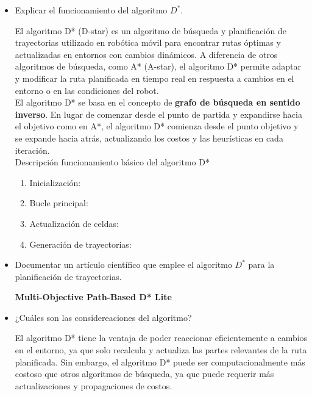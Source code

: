 \documentclass{article}
\begin{document}
\begin{itemize}
\item Explicar el funcionamiento del algoritmo $D^{*}$.

  El algoritmo D* (D-star) es un algoritmo de búsqueda y planificación de trayectorias utilizado en robótica móvil para encontrar rutas óptimas y actualizadas en entornos con cambios dinámicos. A diferencia de otros algoritmos de búsqueda, como A* (A-star), el algoritmo D* permite adaptar y modificar la ruta planificada en tiempo real en respuesta a cambios en el entorno o en las condiciones del robot.\\

  El algoritmo D* se basa en el concepto de \textbf{grafo de búsqueda en sentido inverso}. En lugar de comenzar desde el punto de partida y expandirse hacia el objetivo como en A*, el algoritmo D* comienza desde el punto objetivo y se expande hacia atrás, actualizando los costos y las heurísticas en cada iteración.\\

  Descripción funcionamiento básico del algoritmo D*

  \begin{enumerate}
  \item Inicialización:
  \item Bucle principal:
  \item Actualización de celdas:
  \item Generación de trayectorias:
  \end{enumerate}
  
\item Documentar un artículo científico que emplee el algoritmo $D^{*}$ para la planificación de trayectorias.

  \textbf{Multi-Objective Path-Based D* Lite} 
  
\item ¿Cuáles son las considereaciones del algoritmo?
  
  El algoritmo D* tiene la ventaja de poder reaccionar eficientemente a cambios en el entorno, ya que solo recalcula y actualiza las partes relevantes de la ruta planificada. Sin embargo, el algoritmo D* puede ser computacionalmente más costoso que otros algoritmos de búsqueda, ya que puede requerir más actualizaciones y propagaciones de costos.


\end{itemize}
\end{document}
